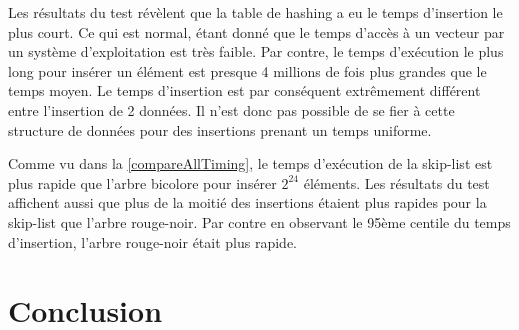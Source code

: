 \documentclass[hidelinks,a4paper, 12pt]{article}
\begin{document}
	Les résultats du test révèlent que la table de hashing a eu le temps d'insertion le plus court. Ce qui est normal, étant donné que le temps d'accès à un vecteur par un système d'exploitation est très faible. Par contre, le temps d'exécution le plus long pour insérer un élément est presque 4 millions de fois plus grandes que le temps moyen. Le temps d'insertion est par conséquent extrêmement différent entre l'insertion de 2 données. Il n'est donc pas possible de se fier à cette structure de données pour des insertions prenant un temps uniforme.
	
	Comme vu dans la \cref{compareAllTiming}, le temps d'exécution de la skip-list est plus rapide que l'arbre bicolore pour insérer $2^{24}$ éléments. Les résultats du test affichent aussi que plus de la moitié des insertions étaient plus rapides pour la skip-list que l'arbre rouge-noir. Par contre en observant le 95ème centile du temps d'insertion, l'arbre rouge-noir était plus rapide.
	
	\begin{table}[h]
		\caption{Différence entre les temps d'insertion}
		\label{deltaTiming}
	\end{table}
	
	\section{Conclusion}
	
\end{document}
